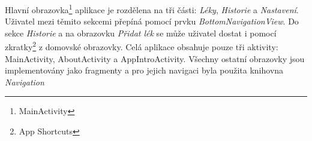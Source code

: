 \documentclass[../TakeYourPill.tex]{subfiles}
\begin{document}
Hlavní obrazovka\footnote{MainActivity} aplikace je rozdělena na tři části: \textit{Léky}, \textit{Historie} a \textit{Nastavení}. Uživatel mezi těmito sekcemi přepíná pomocí prvku \textit{BottomNavigationView}. Do sekce \textit{Historie} a na obrazovku \textit{Přidat lék} se může uživatel dostat i pomocí zkratky\footnote{App Shortcuts} z domovské obrazovky. Celá aplikace obsahuje pouze tři aktivity: MainActivity, AboutActivity a AppIntroActivity. Všechny ostatní obrazovky jsou implementovány jako fragmenty a pro jejich navigaci byla použita knihovna \textit{Navigation} \cite{navigation}
\end{document}
